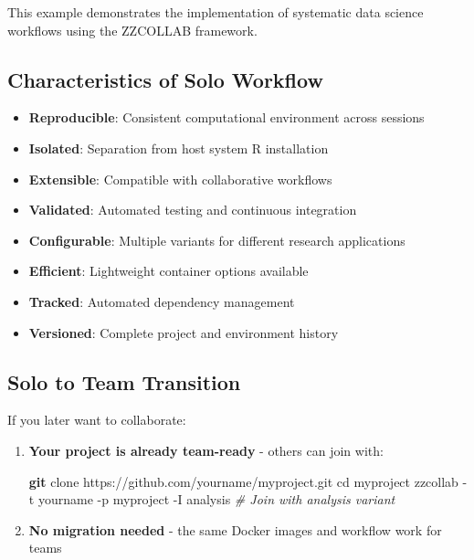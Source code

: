 \documentclass[
]{article}
\newenvironment{Shaded}{\begin{snugshade}}{\end{snugshade}}
\newcommand{\AttributeTok}[1]{\textcolor[rgb]{0.13,0.29,0.53}{#1}}
\newcommand{\BuiltInTok}[1]{#1}
\newcommand{\CommentTok}[1]{\textcolor[rgb]{0.56,0.35,0.01}{\textit{#1}}}
\newcommand{\ExtensionTok}[1]{#1}
\newcommand{\FunctionTok}[1]{\textcolor[rgb]{0.13,0.29,0.53}{\textbf{#1}}}
\newcommand{\NormalTok}[1]{#1}
\providecommand{\tightlist}{%
  \setlength{\itemsep}{0pt}\setlength{\parskip}{0pt}}
\begin{document}
This example demonstrates the implementation of systematic data science
workflows using the ZZCOLLAB framework.

\subsection{Characteristics of Solo
Workflow}\label{characteristics-of-solo-workflow}

\begin{itemize}
\tightlist
\item
  \textbf{Reproducible}: Consistent computational environment across
  sessions
\item
  \textbf{Isolated}: Separation from host system R installation
\item
  \textbf{Extensible}: Compatible with collaborative workflows
\item
  \textbf{Validated}: Automated testing and continuous integration
\item
  \textbf{Configurable}: Multiple variants for different research
  applications
\item
  \textbf{Efficient}: Lightweight container options available
\item
  \textbf{Tracked}: Automated dependency management
\item
  \textbf{Versioned}: Complete project and environment history
\end{itemize}

\subsection{Solo to Team Transition}\label{solo-to-team-transition}

If you later want to collaborate:

\begin{enumerate}
\def\labelenumi{\arabic{enumi}.}
\item
  \textbf{Your project is already team-ready} - others can join with:

\begin{Shaded}
\begin{Highlighting}[]
\FunctionTok{git}\NormalTok{ clone https://github.com/yourname/myproject.git}
\BuiltInTok{cd}\NormalTok{ myproject}
\ExtensionTok{zzcollab} \AttributeTok{{-}t}\NormalTok{ yourname }\AttributeTok{{-}p}\NormalTok{ myproject }\AttributeTok{{-}I}\NormalTok{ analysis  }\CommentTok{\# Join with analysis variant}
\end{Highlighting}
\end{Shaded}
\item
  \textbf{No migration needed} - the same Docker images and workflow
  work for teams
\end{enumerate}
\end{document}
